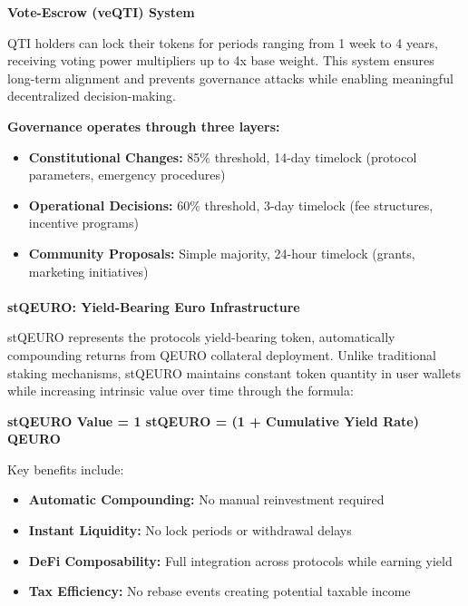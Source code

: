 \textbf{Vote-Escrow (veQTI) System}

QTI holders can lock their tokens for periods ranging from 1 week to 4
years, receiving voting power multipliers up to 4x base weight. This
system ensures long-term alignment and prevents governance attacks while
enabling meaningful decentralized decision-making.

\textbf{Governance operates through three layers:}

\begin{itemize}
\item
  \textbf{Constitutional Changes:} 85\% threshold, 14-day timelock
  (protocol parameters, emergency procedures)
\item
  \textbf{Operational Decisions:} 60\% threshold, 3-day timelock (fee
  structures, incentive programs)
\item
  \textbf{Community Proposals:} Simple majority, 24-hour timelock
  (grants, marketing initiatives)
\end{itemize}

\hypertarget{section-2}{%
\paragraph{}\label{section-2}}

\textbf{stQEURO: Yield-Bearing Euro Infrastructure}

stQEURO represents the protocol\textquotesingle s yield-bearing token,
automatically compounding returns from QEURO collateral deployment.
Unlike traditional staking mechanisms, stQEURO maintains constant token
quantity in user wallets while increasing intrinsic value over time
through the formula:

\textbf{stQEURO Value = 1 stQEURO = (1 + Cumulative Yield Rate) QEURO}

Key benefits include:

\begin{itemize}
\item
  \textbf{Automatic Compounding:} No manual reinvestment required
\item
  \textbf{Instant Liquidity:} No lock periods or withdrawal delays
\item
  \textbf{DeFi Composability:} Full integration across protocols while
  earning yield
\item
  \textbf{Tax Efficiency:} No rebase events creating potential taxable
  income
\end{itemize}

\hypertarget{section-3}{%
\paragraph{}\label{section-3}}

